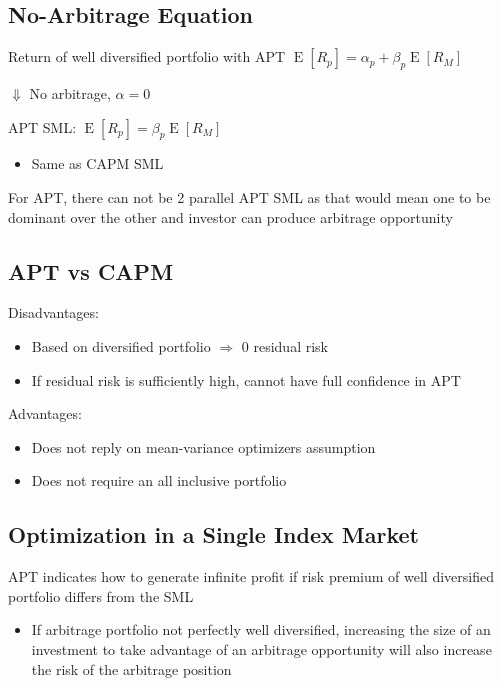 \documentclass[]{book}
\providecommand{\tightlist}{%
  \setlength{\itemsep}{0pt}\setlength{\parskip}{0pt}}
\theoremstyle{definition}
\theoremstyle{definition}
\theoremstyle{remark}
\begin{document}
\subsection{No-Arbitrage Equation}\label{no-arbitrage-equation}

Return of well diversified portfolio with APT
\(\operatorname{E}[R_p] = \alpha_p + \beta_p \operatorname{E}[R_M]\)

\(\Downarrow\) No arbitrage, \(\alpha = 0\)

APT SML: \(\operatorname{E}[R_p] = \beta_p \operatorname{E}[R_M]\)

\begin{itemize}
\tightlist
\item
  Same as CAPM SML
\end{itemize}

For APT, there can not be 2 parallel APT SML as that would mean one to
be dominant over the other and investor can produce arbitrage
opportunity

\subsection{APT vs CAPM}\label{apt-vs-capm}

Disadvantages:

\begin{itemize}
\item
  Based on diversified portfolio \(\Rightarrow\) 0 residual risk
\item
  If residual risk is sufficiently high, cannot have full confidence in
  APT
\end{itemize}

Advantages:

\begin{itemize}
\item
  Does not reply on mean-variance optimizers assumption
\item
  Does not require an all inclusive portfolio
\end{itemize}

\subsection{Optimization in a Single Index
Market}\label{optimization-in-a-single-index-market}

APT indicates how to generate infinite profit if risk premium of well
diversified portfolio differs from the SML

\begin{itemize}
\tightlist
\item
  If arbitrage portfolio not perfectly well diversified, increasing the
  size of an investment to take advantage of an arbitrage opportunity
  will also increase the risk of the arbitrage position
\end{itemize}
\end{document}
